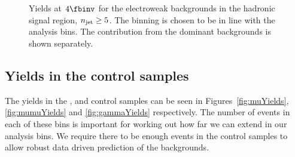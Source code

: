 \begin{figure}[]
  \\
  \\
  \caption{\label{fig:ewkYields4} Yields at $4\fbinv$ for the electroweak backgrounds in the
  hadronic signal region, $n_{\text{jet}}\geq5$. The binning is chosen to be in line with the analysis
  bins. The contribution from the dominant backgrounds is shown separately.}
\end{figure}

\subsection{Yields in the control samples}

The yields in the \mj, \mmj and \gj control samples can be seen in
Figures~\ref{fig:muYields}, \ref{fig:mumuYields} and \ref{fig:gammaYields}
respectively. The number of events in each of these bins is important for
working out how far we can extend in our analysis bins. We require there to be
enough events in the control samples to allow robust data driven prediction of
the backgrounds.

